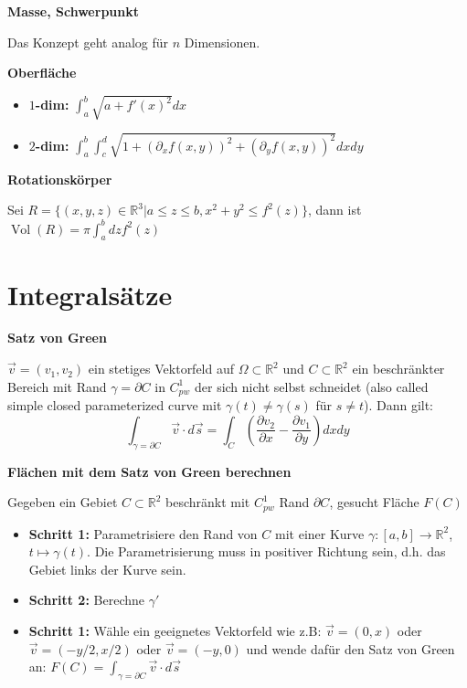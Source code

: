 \documentclass[25pt]{sciposter}
\newcommand{\R}{\mathbb{R}}
\newenvironment{method}[1]{\begin{mdframed}[backgroundcolor=blue!10,innertopmargin=15pt, innerbottommargin=15pt, nobreak=true]
		\textbf{#1 }
	}
	{ 
	\end{mdframed}
}
\begin{document}
\begin{multicols}{3}
\begin{method}{Masse, Schwerpunkt}
	 Das Konzept geht analog für $n$ Dimensionen.
\end{method}



\begin{method}{Oberfläche}
	\begin{itemize}
		\item \textbf{$1$-dim:}  $\int_{a}^{b} \sqrt{a+f'(x)^2} dx$
		\item \textbf{$2$-dim:} $\int_{a}^{b} \int_{c}^{d} \sqrt{1 + (\partial_{x} f(x,y))^2 + (\partial_{y} f(x,y))^2} dx dy$
	\end{itemize}
\end{method}


\begin{method}{Rotationskörper}
	Sei $R = \{(x,y,z) \in \R^3 | a \leq z \leq b, x^2 + y^2 \leq f^2(z)  \}$, dann ist $\operatorname{Vol}(R) = \pi \int_{a}^{b} dz f^2(z)$
\end{method}


\section*{Integralsätze}

\begin{method}{Satz von Green}
	$\vec{v} = (v_1,v_2)$ ein stetiges Vektorfeld auf $\Omega \subset \R^2$ und $C\subset \R^2$ ein beschränkter Bereich mit Rand $\gamma = \partial C$ in $C_{pw}^1$ der sich nicht selbst schneidet (also called simple closed parameterized curve mit $\gamma(t)\not=\gamma(s)$ für $s\neq t$). Dann gilt:
	$$\int_{\gamma = \partial C} \vec{v} \cdot d\vec{s} = \int_{C} \left( \frac{\partial v_2}{\partial x} -  \frac{\partial v_1}{\partial y}\right)dxdy$$
\end{method}

\begin{method}{Flächen mit dem Satz von Green berechnen}
	Gegeben ein Gebiet $C\subset \R^2$ beschränkt mit $C_{pw}^1$ Rand $\partial C$, gesucht Fläche $F(C)$
	\begin{itemize}
		\item \textbf{Schritt 1:} Parametrisiere den Rand von $C$ mit einer Kurve $\gamma:[a,b]\to \R^2$, $t\mapsto \gamma(t)$. Die Parametrisierung muss in positiver Richtung sein, d.h. das Gebiet links der Kurve sein.
		\item \textbf{Schritt 2:} Berechne $\gamma'$
		\item \textbf{Schritt 1:} Wähle ein geeignetes Vektorfeld wie z.B: $\vec{v} = (0,x)$ oder $\vec{v} = (-y/2,x/2)$ oder $\vec{v} = (-y,0)$ und wende dafür den Satz von Green an: $F(C) = \int_{\gamma=\partial C} \vec{v}\cdot d\vec{s}$
	\end{itemize}
\end{method}





\end{multicols}
\end{document}
